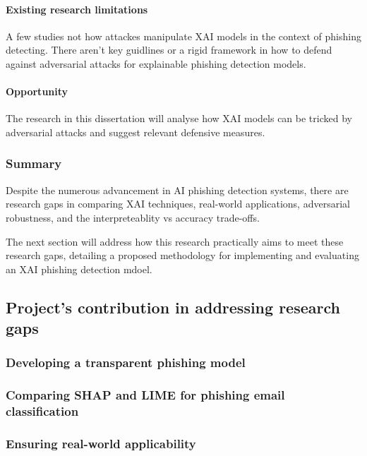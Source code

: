\paragraph{Existing research limitations}
A few studies not how attackes manipulate XAI models in the context of phishing detecting. There aren't key guidlines or a rigid framework in how to defend against adversarial attacks for explainable phishing detection models.

\paragraph{Opportunity}
The research in this dissertation will analyse how XAI models can be tricked by adversarial attacks and suggest relevant defensive measures.

\subsubsection*{Summary}
Despite the numerous advancement in AI phishing detection systems, there are research gaps in comparing XAI techniques, real-world applications, adversarial robustness, and the interpreteablity vs accuracy trade-offs.\newline

\noindent The next section will address how this research practically aims to meet these research gaps, detailing a proposed methodology for implementing and evaluating an XAI phishing detection mdoel.

\newpage

\subsection*{Project's contribution in addressing research gaps}

\subsubsection*{Developing a transparent phishing model}

\subsubsection*{Comparing SHAP and LIME for phishing email classification}

\subsubsection*{Ensuring real-world applicability}
